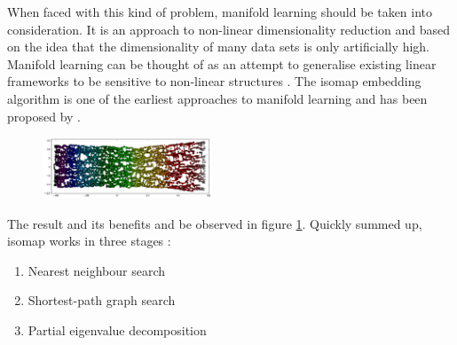 \vspace{-2mm}
\noindent When faced with this kind of problem, manifold learning should be taken into consideration.
It is an approach to non-linear dimensionality reduction and based on the idea that the dimensionality of many data sets is only artificially high.
Manifold learning can be thought of as an attempt to generalise existing linear frameworks to be sensitive to non-linear structures \cite{scikit-learn}.
The isomap embedding algorithm is one of the earliest approaches to manifold learning and has been proposed by .

\begin{figure}
	\centering
	\includegraphics[width=0.45\textwidth]{external_content/graphs/swiss_roll-manifold.png}
	\captionsetup{justification=centering}
	\label{fig:swissrollmanifold}
\end{figure}

\noindent
The result and its benefits and be observed in figure \ref{fig:swissrollmanifold}.
Quickly summed up, isomap works in three stages \cite{scikit-learn}:

\begin{enumerate}
	\vspace{-2mm}
	\item Nearest neighbour search
	\vspace{-2mm}
	\item Shortest-path graph search
	\vspace{-2mm}
	\item Partial eigenvalue decomposition
\end{enumerate}





